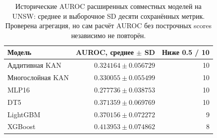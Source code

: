 \begin{table}[!htbp]
\centering\small
\caption{Исторические AUROC расширенных совместных моделей на UNSW: среднее и выборочное SD десяти сохранённых метрик. Проверена агрегация, но сам расчёт AUROC без построчных scores независимо не повторён.}
\label{tab:unsw-auroc}
\begin{tabular}{lrr}
\toprule
Модель & AUROC, среднее $\pm$ SD & Ниже 0.5 / 10\\
\midrule
Аддитивная KAN & $0.324164\pm0.056729$ & 10\\
Многослойная KAN & $0.330055\pm0.055499$ & 10\\
MLP16 & $0.277736\pm0.038753$ & 10\\
DT5 & $0.371359\pm0.069769$ & 10\\
LightGBM & $0.370156\pm0.072272$ & 9\\
XGBoost & $0.413953\pm0.074862$ & 8\\
\bottomrule
\end{tabular}
\end{table}
